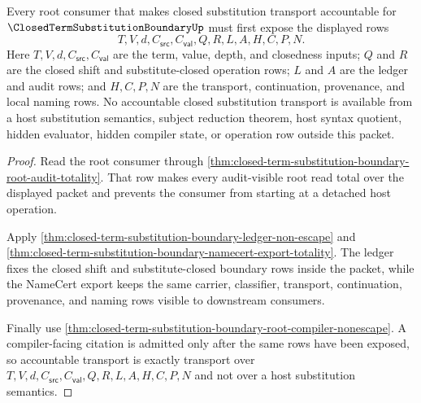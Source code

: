 \begin{theorem}
\label{thm:closed-term-substitution-boundary-root-transport-accountability}
Every root consumer that makes closed substitution transport accountable for $\ClosedTermSubstitutionBoundaryUp$ must first expose the displayed rows
$$
T,V,d,C_{\mathsf{src}},C_{\mathsf{val}},Q,R,L,A,H,C,P,N.
$$
Here $T,V,d,C_{\mathsf{src}},C_{\mathsf{val}}$ are the term, value, depth, and closedness inputs; $Q$ and $R$ are the closed shift and substitute-closed operation rows; $L$ and $A$ are the ledger and audit rows; and $H,C,P,N$ are the transport, continuation, provenance, and local naming rows. No accountable closed substitution transport is available from a host substitution semantics, subject reduction theorem, host syntax quotient, hidden evaluator, hidden compiler state, or operation row outside this packet.
\end{theorem}
\begin{proof}
Read the root consumer through \autoref{thm:closed-term-substitution-boundary-root-audit-totality}. That row makes every audit-visible root read total over the displayed packet and prevents the consumer from starting at a detached host operation.

Apply \autoref{thm:closed-term-substitution-boundary-ledger-non-escape} and \autoref{thm:closed-term-substitution-boundary-namecert-export-totality}. The ledger fixes the closed shift and substitute-closed boundary rows inside the packet, while the NameCert export keeps the same carrier, classifier, transport, continuation, provenance, and naming rows visible to downstream consumers.

Finally use \autoref{thm:closed-term-substitution-boundary-root-compiler-nonescape}. A compiler-facing citation is admitted only after the same rows have been exposed, so accountable transport is exactly transport over $T,V,d,C_{\mathsf{src}},C_{\mathsf{val}},Q,R,L,A,H,C,P,N$ and not over a host substitution semantics.
\end{proof}

